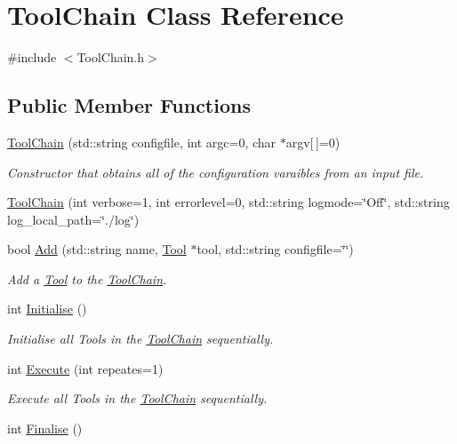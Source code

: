 \hypertarget{classToolChain}{\section{Tool\-Chain Class Reference}
\label{classToolChain}
}


{\ttfamily \#include $<$Tool\-Chain.\-h$>$}

\subsection*{Public Member Functions}
\begin{DoxyCompactItemize}
\item 
\hyperlink{classToolChain_a133e224899a743ee4a679396f8569bf9}{Tool\-Chain} (std\-::string configfile, int argc=0, char $\ast$argv\mbox{[}$\,$\mbox{]}=0)
\begin{DoxyCompactList}\small\item\em Constructor that obtains all of the configuration varaibles from an input file. \end{DoxyCompactList}\item 
\hyperlink{classToolChain_a04186696e28e3193b2fc756a89d14882}{Tool\-Chain} (int verbose=1, int errorlevel=0, std\-::string logmode=\char`\"{}Off\char`\"{}, std\-::string log\-\_\-local\-\_\-path=\char`\"{}./log\char`\"{})
\item 
bool \hyperlink{classToolChain_ae6859092e14be1f9538c50d7c838fe8e}{Add} (std\-::string name, \hyperlink{classTool}{Tool} $\ast$tool, std\-::string configfile=\char`\"{}\char`\"{})
\begin{DoxyCompactList}\small\item\em Add a \hyperlink{classTool}{Tool} to the \hyperlink{classToolChain}{Tool\-Chain}. \end{DoxyCompactList}\item 
\hypertarget{classToolChain_a341f343926341b82a29c586a7b9683af}{int \hyperlink{classToolChain_a341f343926341b82a29c586a7b9683af}{Initialise} ()}\label{classToolChain_a341f343926341b82a29c586a7b9683af}

\begin{DoxyCompactList}\small\item\em Initialise all Tools in the \hyperlink{classToolChain}{Tool\-Chain} sequentially. \end{DoxyCompactList}\item 
int \hyperlink{classToolChain_a303e299293fd4d3a5e91865e04898e52}{Execute} (int repeates=1)
\begin{DoxyCompactList}\small\item\em Execute all Tools in the \hyperlink{classToolChain}{Tool\-Chain} sequentially. \end{DoxyCompactList}\item 
\hypertarget{classToolChain_a3828756135773fb9ca4b361a47296dd9}{int \hyperlink{classToolChain_a3828756135773fb9ca4b361a47296dd9}{Finalise} ()}\label{classToolChain_a3828756135773fb9ca4b361a47296dd9}


\end{DoxyCompactItemize}
